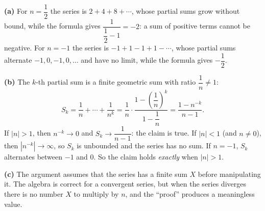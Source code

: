\textbf{(a)} For $n=\dfrac12$ the series is $2+4+8+\cdots$, whose partial sums grow without bound, while the formula gives $\dfrac{1}{\dfrac12-1}=-2$: a sum of positive terms cannot be negative. For $n=-1$ the series is $-1+1-1+1-\cdots$, whose partial sums alternate $-1,0,-1,0,\dots$ and have no limit, while the formula gives $-\dfrac12$.

\textbf{(b)} The $k$-th partial sum is a finite geometric sum with ratio $\dfrac1n\ne1$:
\[S_k=\dfrac1n+\cdots+\dfrac1{n^k}=\dfrac1n\cdot\dfrac{1-\left(\dfrac1n\right)^k}{1-\dfrac1n}=\dfrac{1-n^{-k}}{n-1}.\]
If $|n|>1$, then $n^{-k}\to0$ and $S_k\to\dfrac1{n-1}$: the claim is true. If $|n|<1$ (and $n\ne0$), then $\left|n^{-k}\right|\to\infty$, so $S_k$ is unbounded and the series has no sum. If $n=-1$, $S_k$ alternates between $-1$ and $0$. So the claim holds \emph{exactly} when $\boxed{|n|>1}$.

\textbf{(c)} The argument assumes that the series has a finite sum $X$ before manipulating it. The algebra is correct for a convergent series, but when the series diverges there is no number $X$ to multiply by $n$, and the ``proof'' produces a meaningless value.
